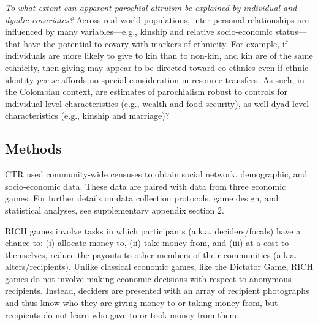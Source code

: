 \documentclass[bibauthoryear]{aa}
\begin{document}
\begin{enumerate*}[label={Q(\arabic*)},font={\color{blue!50!black}\bfseries}]
\item \label{q5} \emph{To what extent can apparent parochial altruism be explained by individual and dyadic covariates?} 
Across real-world populations, inter-personal relationships are influenced by many variables---e.g., kinship and relative socio-economic status---that have the potential to covary with markers of ethnicity. For example, if individuals are more likely to give to kin than to non-kin, and kin are of the same ethnicity, then giving may appear to be directed toward co-ethnics even if ethnic identity \emph{per se} affords no special consideration in resource transfers. As such, in the Colombian context, are estimates of parochialism  robust to controls for individual-level  characteristics (e.g., wealth and food security), as well dyad-level characteristics (e.g., kinship and  marriage)? 

\end{enumerate*}


\subsection{Methods}
CTR used community-wide censuses to obtain social network, demographic, and socio-economic data.  These data are paired with data from three economic games. For further details on data collection protocols, game design, and statistical analyses, see supplementary appendix section 2.

 RICH games \citep{gervais2017rich} involve tasks in which participants (a.k.a. deciders/focals) have a chance to: (i) allocate money to, (ii) take money from, and (iii) at a cost to themselves, reduce the payouts to other members of their communities (a.k.a. alters/recipients). Unlike classical economic games, like the Dictator  Game, RICH games do not involve making economic decisions with respect to anonymous recipients. Instead, deciders are presented with an array of recipient photographs and thus know who they are giving money to or taking money from, but recipients do not learn who gave to or took money from them. 
\end{document}
